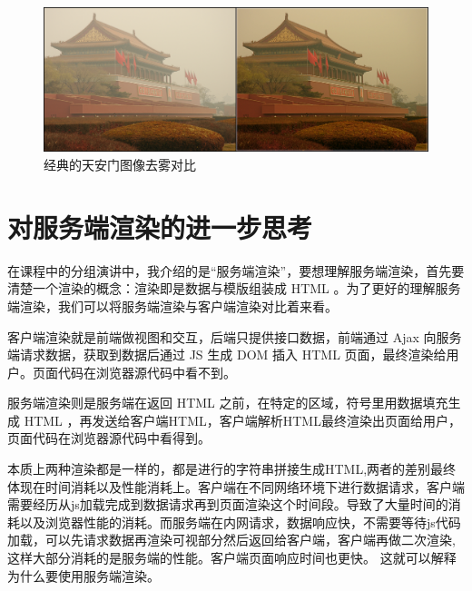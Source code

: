 \documentclass{article}
\begin{document}
\begin{figure}[ht]
\centering
\includegraphics[scale=0.3]{dehaze1.png}
\caption{经典的天安门图像去雾对比}
\label{fig:label}
\end{figure}



\section{对服务端渲染的进一步思考}
在课程中的分组演讲中，我介绍的是“服务端渲染”，要想理解服务端渲染，首先要清楚一个渲染的概念：渲染即是数据与模版组装成 HTML 。为了更好的理解服务端渲染，我们可以将服务端渲染与客户端渲染对比着来看。\par
客户端渲染就是前端做视图和交互，后端只提供接口数据，前端通过 Ajax 向服务端请求数据，获取到数据后通过 JS 生成 DOM 插入 HTML 页面，最终渲染给用户。页面代码在浏览器源代码中看不到。\par
服务端渲染则是服务端在返回 HTML 之前，在特定的区域，符号里用数据填充生成 HTML ，再发送给客户端HTML，客户端解析HTML最终渲染出页面给用户，页面代码在浏览器源代码中看得到。\par
本质上两种渲染都是一样的，都是进行的字符串拼接生成HTML,两者的差别最终体现在时间消耗以及性能消耗上。客户端在不同网络环境下进行数据请求，客户端需要经历从js加载完成到数据请求再到页面渲染这个时间段。导致了大量时间的消耗以及浏览器性能的消耗。而服务端在内网请求，数据响应快，不需要等待js代码加载，可以先请求数据再渲染可视部分然后返回给客户端，客户端再做二次渲染,这样大部分消耗的是服务端的性能。客户端页面响应时间也更快。
这就可以解释为什么要使用服务端渲染。
\end{document}

